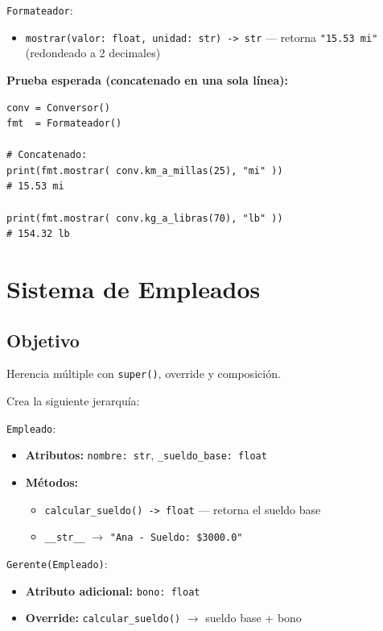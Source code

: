 \documentclass[11pt,letterpaper]{article}
\begin{document}
\texttt{Formateador}:
\begin{itemize}[nosep]
  \item \texttt{mostrar(valor: float, unidad: str) -> str} --- retorna \texttt{"15.53 mi"} (redondeado a 2 decimales)
\end{itemize}

\textbf{Prueba esperada (concatenado en una sola línea):}
\begin{lstlisting}
conv = Conversor()
fmt  = Formateador()

# Concatenado:
print(fmt.mostrar( conv.km_a_millas(25), "mi" ))
# 15.53 mi

print(fmt.mostrar( conv.kg_a_libras(70), "lb" ))
# 154.32 lb
\end{lstlisting}


\vspace{.5cm}
\hfill{}
\vspace{2pt}

\section{Sistema de Empleados}
\subsection{Objetivo} Herencia múltiple con \texttt{super()}, override y composición.

Crea la siguiente jerarquía:

\texttt{Empleado}:
\begin{itemize}[nosep]
  \item \textbf{Atributos:} \texttt{nombre: str}, \texttt{\_sueldo\_base: float}
  \item \textbf{Métodos:}
  \begin{itemize}[nosep]
    \item \texttt{calcular\_sueldo() -> float} --- retorna el sueldo base
    \item \texttt{\_\_str\_\_} $\to$ \texttt{"Ana - Sueldo: \$3000.0"}
  \end{itemize}
\end{itemize}

\texttt{Gerente(Empleado)}:
\begin{itemize}[nosep]
  \item \textbf{Atributo adicional:} \texttt{bono: float}
  \item \textbf{Override:} \texttt{calcular\_sueldo()} $\to$ sueldo base + bono
\end{itemize}
\end{document}

